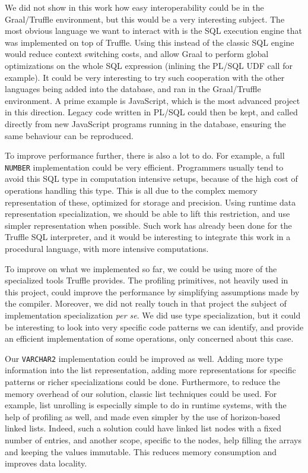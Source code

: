 \documentclass[twoside,11pt,a4paper]{article}
\newcommand{\pls}[1]{\small\texttt{#1}\normalsize}
\newcommand{\plstype}[1]{\pls{#1}}
\newcommand{\varchar}{\plstype{VARCHAR2}}
\newcommand{\oranum}{\plstype{NUMBER}}
\begin{document}
We did not show in this work how easy interoperability could be in the Graal/Truffle environment, but this would be a very interesting subject. The most obvious language we want to interact with is the SQL execution engine that was implemented on top of Truffle. Using this instead of the classic SQL engine would reduce context switching costs, and allow Graal to perform global optimizations on the whole SQL expression (inlining the PL/SQL UDF call for example). It could be very interesting to try such cooperation with the other languages being added into the database, and ran in the Graal/Truffle environment. A prime example is JavaScript, which is the most advanced project in this direction. Legacy code written in PL/SQL could then be kept, and called directly from new JavaScript programs running in the database, ensuring the same behaviour can be reproduced.

To improve performance further, there is also a lot to do. For example, a full \oranum{} implementation could be very efficient. Programmers usually tend to avoid this SQL type in computation intensive setups, because of the high cost of operations handling this type. This is all due to the complex memory representation of these, optimized for storage and precision. Using runtime data representation specialization, we should be able to lift this restriction, and use simpler representation when possible. Such work has already been done for the Truffle SQL interpreter, and it would be interesting to integrate this work in a procedural language, with more intensive computations.

To improve on what we implemented so far, we could be using more of the specialized tools Truffle provides. The profiling primitives, not heavily used in this project, could improve the performance by simplifying assumptions made by the compiler. Moreover, we did not really touch in that project the subject of implementation specialization \textit{per se}. We did use type specialization, but it could be interesting to look into very specific code patterns we can identify, and provide an efficient implementation of some operations, only concerned about this case.

Our \varchar{} implementation could be improved as well. Adding more type information into the list representation, adding more representations for specific patterns or richer specializations could be done. Furthermore, to reduce the memory overhead of our solution, classic list techniques could be used. For example, list unrolling is especially simple to do in runtime systems, with the help of profiling as well, and made even simpler by the use of horizon-based linked lists. Indeed, such a solution could have linked list nodes with a fixed number of entries, and another scope, specific to the nodes, help filling the arrays and keeping the values immutable. This reduces memory consumption and improves data locality.
\end{document}
